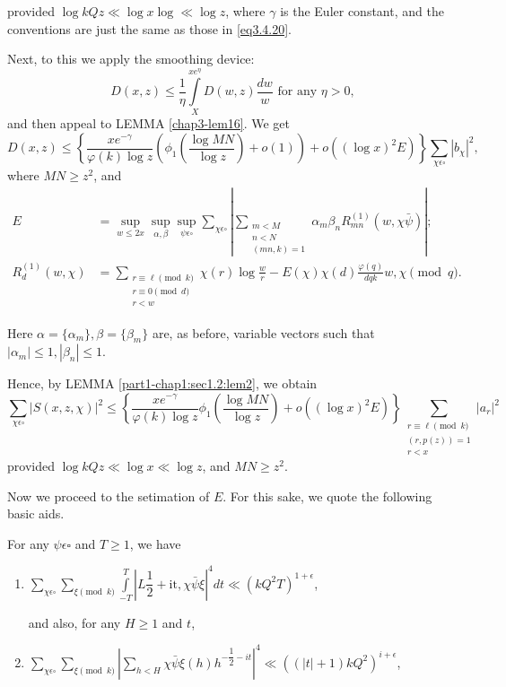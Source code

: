 provided $\log kQz \ll \log x \log \ll \log z$, where $\gamma$ is the
Euler constant, and the conventions are just the same as those in
\eqref{eq3.4.20}. 

Next, to this we apply the smoothing device:
$$
D (x,z) \le \frac{1}{\eta} \int\limits_{X}^{xe^\eta} D(w,z)
\frac{dw}{w} \text{ for any } \eta > 0,  
$$
and then appeal to LEMMA \ref{chap3-lem16}. We get
$$
  D (x,z) \le \left\{\frac{x e^{-\gamma}}{\varphi (k) \log z}
  \left(\phi_1\left(\frac{\log MN} {\log z} \right) + o (1)\right)+ o
  ((\log x)^2 E)\right\} 
  \sum_{\chi \epsilon  \square } |b_\chi|^2, 
$$
where $MN \ge z^2$, and
\begin{align*}
  E &=\sup_{w \le 2x} \sup_{\alpha,\beta} \sup_{\psi \epsilon  \square 
  }\sum_{\chi \epsilon  \square }| \sum_{\substack{m < M \\ n < N
      \\ (mn,k) =1}} \alpha_m \beta_n R_{mn}^{(1)} (w, \chi
  \bar{\psi})|;\\ 
  R^{(1)}_d (w, \chi) &= \sum_{\substack{ r \equiv \ell \pmod{k} \\ r
    \equiv 0 \pmod{d} \\ r < w}} \chi(r) \log \frac{w}{r}- E(\chi)
  \chi(d) \frac{\varphi(q)}{dqk} w, \chi \pmod{q}. 
\end{align*}\pageoriginale

Here $\alpha = \{\alpha_m\}, \beta = \{\beta_m\}$ are, as before,
variable vectors such that $|\alpha_m|\le 1,| \beta_n| \le 1$. 

Hence, by LEMMA \ref{part1-chap1:sec1.2:lem2}, we obtain
{\fontsize{10pt}{12pt}\selectfont
\begin{equation*}
\sum_{\chi \epsilon  \square } |S (x,z, \chi)|^2
\le \left\{\frac{xe^{-\gamma}} {\varphi(k) \log z} \phi_1 \left(\frac{\log MN}
    {\log z}\right) + o ((\log x)^2E)\right\} \sum_{\substack{ r
        \equiv \ell \pmod{k}  \\ (r,p (z)) = 1 \\ r < x}} |a_r|^2
    \tag{4.3.2} \label{eq4.3.2} 
\end{equation*}}\relax
provided $\log kQz \ll \log x \ll \log z$, and $MN \ge z^2$.

Now we proceed to the setimation of $E$. For this sake, we quote the
following basic aids. 

\begin{Lemma}\label{chap4-lem20}%
For any $\psi \epsilon  \square  $ and $T \ge 1$, we have 
\begin{enumerate}[\rm (i)]
\item $ \sum\limits_{\chi \epsilon  \square } \sum\limits_{\xi \pmod{k}}
  \int\limits_{-T}^T |L \dfrac{1}{2} + \text{it}, \chi \bar{\psi}
  \xi|^4 dt \ll (kQ^2 T)^{1+\epsilon }$, 

and also, for any $H \ge 1$ and $t$,
\item $ \sum \limits_{\chi \epsilon \square} \sum\limits_{\xi
  \pmod{k}}| \sum\limits_{h < H} \chi \bar{\psi} \xi (h) h^{ -\dfrac{1}{2}-
    it} |^4 \ll ((|t| + 1) kQ^2)^{i+\epsilon } $, 
\end{enumerate}
\end{Lemma}

